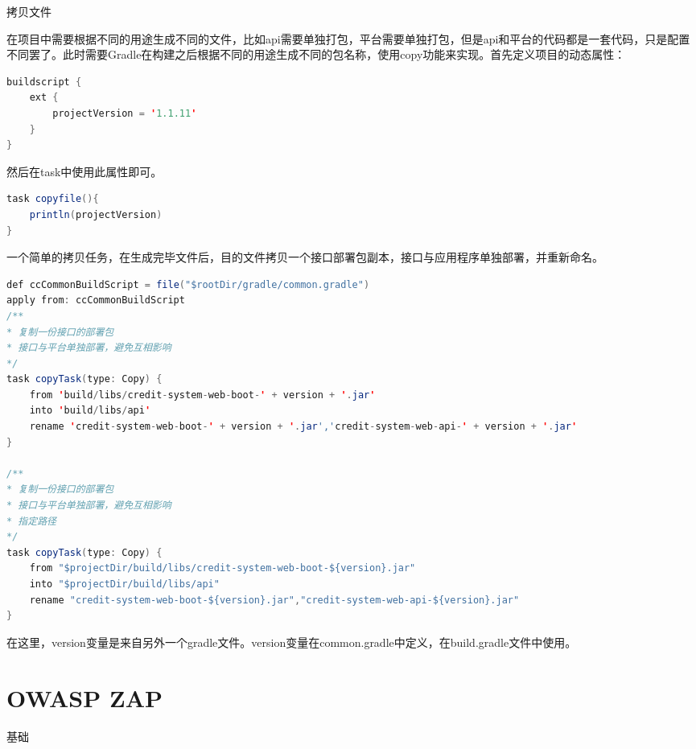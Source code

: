 \documentclass[12pt]{book}
\makeatletter
\numberwithin{dummy}{section}
\theoremstyle{ocrenumbox}
\theoremstyle{blacknumex}
\theoremstyle{blacknumbox}
\theoremstyle{ocrenum}
\renewcommand{\section}{\@startsection{section}{1}{\z@}
	{-4ex \@plus -1ex \@minus -.4ex}
	{1ex \@plus.2ex }
	{\normalfont\large\sffamily\bfseries}}
\renewcommand\paragraph{\@startsection{paragraph}{4}{\z@}
	{-2ex \@plus-.2ex \@minus .2ex}
	{.1ex}
	{\normalfont\small\sffamily\bfseries}}
\makeatother
\begin{document}
\paragraph{拷贝文件}

在项目中需要根据不同的用途生成不同的文件，比如api需要单独打包，平台需要单独打包，但是api和平台的代码都是一套代码，只是配置不同罢了。此时需要Gradle在构建之后根据不同的用途生成不同的包名称，使用copy功能来实现。首先定义项目的动态属性：

\begin{lstlisting}[language=Java]
buildscript {
	ext {
		projectVersion = '1.1.11'
	}
}
\end{lstlisting}

然后在task中使用此属性即可。

\begin{lstlisting}[language=Java]
task copyfile(){
	println(projectVersion)
}
\end{lstlisting}

一个简单的拷贝任务，在生成完毕文件后，目的文件拷贝一个接口部署包副本，接口与应用程序单独部署，并重新命名。

\begin{lstlisting}[language=Java]
def ccCommonBuildScript = file("$rootDir/gradle/common.gradle")
apply from: ccCommonBuildScript
/**
* 复制一份接口的部署包
* 接口与平台单独部署，避免互相影响
*/
task copyTask(type: Copy) {
	from 'build/libs/credit-system-web-boot-' + version + '.jar'
	into 'build/libs/api'
	rename 'credit-system-web-boot-' + version + '.jar','credit-system-web-api-' + version + '.jar'
}

/**
* 复制一份接口的部署包
* 接口与平台单独部署，避免互相影响
* 指定路径
*/
task copyTask(type: Copy) {
	from "$projectDir/build/libs/credit-system-web-boot-${version}.jar"
	into "$projectDir/build/libs/api"
	rename "credit-system-web-boot-${version}.jar","credit-system-web-api-${version}.jar"
}
\end{lstlisting}

在这里，version变量是来自另外一个gradle文件。version变量在common.gradle中定义，在build.gradle文件中使用。


\chapter{OWASP ZAP}

\section{基础}
\end{document}
